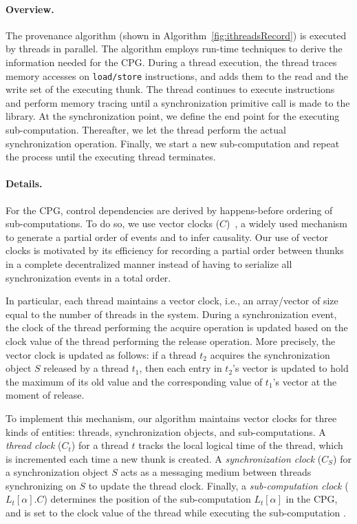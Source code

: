 \paragraph{Overview.}   The provenance algorithm (shown in Algorithm~\ref{fig:ithreadsRecord}) is executed by threads in parallel. The algorithm employs run-time techniques to derive the information needed for the CPG. During a thread execution, the thread traces memory accesses on {\tt load/store} instructions, and adds them to the read and
the write set of the executing thunk. The thread continues to execute instructions and perform memory tracing until a synchronization primitive call is made to the \pthreads  library. At the synchronization point, we define the end point for the executing sub-computation. 
Thereafter, we let the thread perform the actual synchronization operation.
Finally, we start a new sub-computation and repeat the process until the executing thread
terminates. 

 
 

\paragraph{Details.} For the CPG, control dependencies are derived by 
happens-before ordering of sub-computations. To do so, we use vector clocks
($C$)~\cite{Mattern89virtualtime},  a widely used mechanism to generate a partial order of events and to infer causality. Our use of vector
clocks is motivated by its efficiency for recording a partial order between thunks in a complete decentralized manner instead of having to serialize all synchronization events in a total order.

In particular, each thread maintains a vector clock, i.e., an array/vector of size equal to the number of threads in the system.  
During a synchronization event, the clock of the thread performing the
acquire operation is updated based on the clock value of the thread performing
the release operation.  More precisely, the vector clock is updated as follows: if a thread $t_2$ acquires the synchronization
object $S$ released by a thread $t_1$, then each entry in $t_2$'s vector is
updated to hold the maximum of its old value and the corresponding value of
$t_1$'s vector at the moment of release.



To implement this mechanism, our algorithm maintains vector clocks for three kinds of
entities: threads,  synchronization objects, and sub-computations.  A {\em thread clock}
($C_t$) for a thread $t$ tracks the local logical time of the thread, which is
incremented each time a new thunk is created. A {\em synchronization clock}
($C_S$) for a synchronization object $S$ acts as a messaging medium  between
threads synchronizing on $S$ to update the thread clock. Finally, a {\em  sub-computation clock}
($L_t[\alpha].C$) determines the position of the sub-computation $L_t[\alpha]$
in the CPG, and is set to the clock value of the thread while executing the
sub-computation . 



